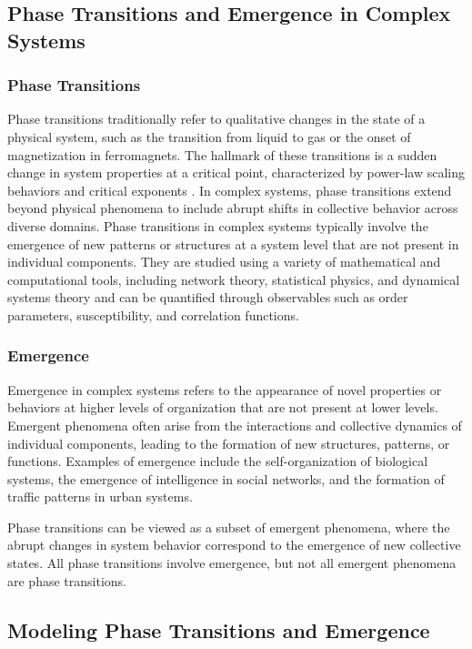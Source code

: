 \subsection{Phase Transitions and Emergence in Complex Systems}

\subsubsection{Phase Transitions}

Phase transitions traditionally refer to qualitative changes in the state of a physical system, such as the transition from liquid to gas or the onset of magnetization in ferromagnets. The hallmark of these transitions is a sudden change in system properties at a critical point, characterized by power-law scaling behaviors and critical exponents \citep{newman2003structure}. In complex systems, phase transitions extend beyond physical phenomena to include abrupt shifts in collective behavior across diverse domains. Phase transitions in complex systems typically involve the emergence of new patterns or structures at a system level that are not present in individual components. They are studied using a variety of mathematical and computational tools, including network theory, statistical physics, and dynamical systems theory and can be quantified through observables such as order parameters, susceptibility, and correlation functions.

\subsubsection{Emergence}

Emergence in complex systems refers to the appearance of novel properties or behaviors at higher levels of organization that are not present at lower levels. Emergent phenomena often arise from the interactions and collective dynamics of individual components, leading to the formation of new structures, patterns, or functions. Examples of emergence include the self-organization of biological systems, the emergence of intelligence in social networks, and the formation of traffic patterns in urban systems.

Phase transitions can be viewed as a subset of emergent phenomena, where the abrupt changes in system behavior correspond to the emergence of new collective states. All phase transitions involve emergence, but not all emergent phenomena are phase transitions.

\subsection{Modeling Phase Transitions and Emergence}

